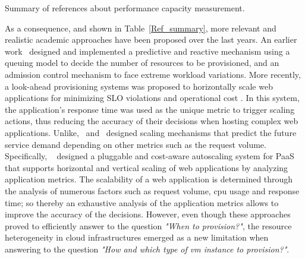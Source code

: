 \begin{table*}
{\caption{Summary of references about performance capacity measurement.}
\label{Ref_summary}
}
\end{table*}

As a consequence, and shown in Table~\ref{Ref_summary}, more relevant and realistic academic approaches have been proposed over the last years. An earlier work~\cite{urgaonkar_agile_2008} designed and implemented a predictive and reactive mechanism using a queuing model to decide the number of resources to be provisioned, and an admission control mechanism to face extreme workload variations. More recently, a look-ahead provisioning systems was proposed to horizontally scale web applications for minimizing SLO violations and operational cost \cite{roy_efficient_2011}. In this system, the application's response time was used as the unique metric to trigger scaling actions, thus reducing the accuracy of their decisions when hosting complex web applications. Unlike,~\cite{ali-eldin_2012} and~\cite{bunch_2012} designed scaling mechanisms that predict the future service demand depending on other metrics such as the request volume. Specifically, ~\cite{bunch_2012} designed a pluggable and cost-aware autoscaling system for PaaS that supports horizontal and vertical scaling of web applications by analyzing application metrics. The scalability of a web application is determined through the analysis of numerous factors such as request volume, cpu usage and response time; so thereby an exhaustive analysis of the application metrics allows to improve the accuracy of the decisions. However, even though these approaches proved to efficiently answer to the question \emph{"When to provision?"}, the resource heterogeneity in cloud infrastructures emerged as a new limitation when answering to the question \emph{"How and which type of vm instance to provision?"}.





